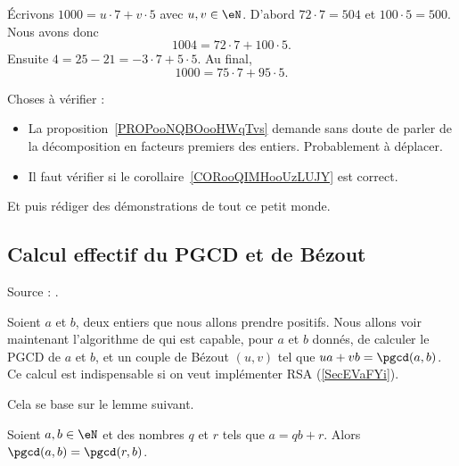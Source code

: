 \begin{example}
    Écrivons \( 1000=u\cdot 7+v\cdot 5\) avec \( u,v\in \eN\). D'abord \( 72\cdot 7=504\) et \( 100\cdot 5=500\). Nous avons donc
    \begin{equation}
        1004=72\cdot 7+100\cdot 5.
    \end{equation}
    Ensuite \( 4=25-21=-3\cdot 7+5\cdot 5\). Au final,
    \begin{equation}
        1000=75\cdot 7+95\cdot 5.
    \end{equation}
\end{example}

\begin{probleme}
    Choses à vérifier :
    \begin{itemize}
        \item La proposition~\ref{PROPooNQBOooHWqTvs} demande sans doute de parler de la décomposition en facteurs premiers des entiers. Probablement à déplacer.
        \item Il faut vérifier si le corollaire~\ref{CORooQIMHooUzLUJY} est correct.
    \end{itemize}
    Et puis rédiger des démonstrations de tout ce petit monde.
\end{probleme}

\subsection{Calcul effectif du PGCD et de Bézout}
\label{subSecIpmnhO}

Source : \cite{BezoutCos}.

Soient \( a\) et \( b\), deux entiers que nous allons prendre positifs. Nous allons voir maintenant l'algorithme de  qui est capable, pour \( a\) et \( b\) donnés, de calculer le PGCD de $a$ et $b$, et un couple de Bézout \( (u,v)\) tel que \( ua+vb=\pgcd(a,b)\). Ce calcul est indispensable si on veut implémenter RSA (\ref{SecEVaFYi}).

Cela se base sur le lemme suivant.

\begin{lemma}       \label{LemiVqita}
    Soient \( a,b\in \eN\) et des nombres \( q\) et \( r\) tels que \( a=qb+r\). Alors \( \pgcd(a,b)=\pgcd(r,b)\).
\end{lemma}

